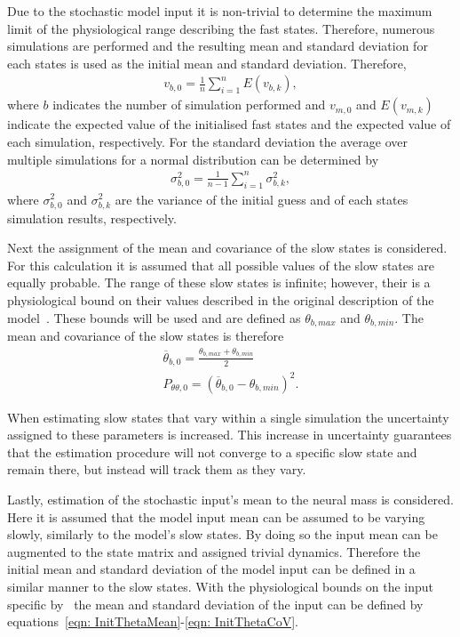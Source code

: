Due to the stochastic model input it is non-trivial to determine the maximum limit of the physiological range describing the fast states. Therefore, numerous simulations are performed and the resulting mean and standard deviation for each states is used as the initial mean and standard deviation. Therefore, \begin{align}
v_{b,0} = \frac{1}{n}\sum\limits_{i=1}^n E(v_{b,k}), \end{align} where $b$ indicates the number of simulation performed and $v_{m,0}$ and $E(v_{m,k})$ indicate the expected value of the initialised fast states and the expected value of each simulation, respectively. For the standard deviation the average over multiple simulations for a normal distribution can be determined by \begin{align}
\sigma^2_{b,0} = \frac{1}{n-1}\sum\limits_{i=1}^n \sigma^2_{b,k},\end{align} where $\sigma^2_{b,0}$ and $\sigma^2_{b,k}$ are the variance of the initial guess and of each states simulation results, respectively.


Next the assignment of the mean and covariance of the slow states is considered. For this calculation it is assumed that all possible values of the slow states are equally probable. The range of these slow states is infinite; however, their is a physiological bound on their values described in the original description of the model~\citep{wendling2002epileptic}. These bounds will be used and are defined as $\theta_{b,max}$ and $\theta_{b,min}$. The mean and covariance of the slow states is therefore\begin{align}
\label{eqn: InitThetaMean}
\overline{\theta}_{b,0} = \frac{\theta_{b,max}+\theta_{b,min}}{2}\\
\label{eqn: InitThetaCoV}
P_{\theta\theta,0} = (\overline{\theta}_{b,0}-\theta_{b,min})^2.
\end{align}

When estimating slow states that vary within a single simulation the uncertainty assigned to these parameters is increased. This increase in uncertainty guarantees that the estimation procedure will not converge to a specific slow state and remain there, but instead will track them as they vary. 

Lastly, estimation of the stochastic input's mean to the neural mass is considered. Here it is assumed that the model input mean can be assumed to be varying slowly, similarly to the model's slow states. By doing so the input mean can be augmented to the state matrix and assigned trivial dynamics. Therefore the initial mean and standard deviation of the model input can be defined in a similar manner to the slow states. With the physiological bounds on the input specific by~\cite{wendling2002epileptic} the mean and standard deviation of the input can be defined by equations~\ref{eqn: InitThetaMean}-\ref{eqn: InitThetaCoV}.

